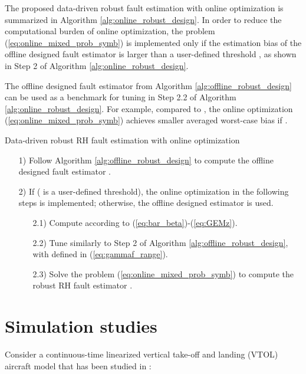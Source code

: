 \documentclass[twocolumn]{autart}
\begin{document}
The proposed data-driven robust fault estimation with online optimization is summarized in Algorithm \ref{alg:online_robust_design}.
In order to reduce the computational burden of online optimization, the problem (\ref{eq:online_mixed_prob_symb}) is implemented only if the estimation bias of the offline designed fault estimator is larger than a user-defined threshold , as shown in Step 2 of Algorithm \ref{alg:online_robust_design}.


The offline designed fault estimator  from Algorithm \ref{alg:offline_robust_design} can be used as a benchmark for tuning  in Step 2.2 of Algorithm \ref{alg:online_robust_design}. For example, compared to , the online optimization (\ref{eq:online_mixed_prob_symb}) achieves smaller averaged worst-case bias if .

\begin{algorithm}
  \caption{Data-driven robust RH fault estimation with online optimization}
  \label{alg:online_robust_design}
  \begin{algorithmic}
    \State
    \begin{enumerate}
      \item[1)] Follow Algorithm \ref{alg:offline_robust_design} to compute the offline designed fault estimator .
      \item[2)] If  ( is a user-defined threshold), the online optimization in the following steps is implemented; otherwise, the offline designed estimator  is used.
          \begin{enumerate}
            \item[2.1)] Compute  according to (\ref{eq:bar_beta})-(\ref{eq:GEMz}).
            \item[2.2)] Tune  similarly to Step 2 of Algorithm \ref{alg:offline_robust_design}, with  defined in (\ref{eq:gammaf_range}).
            \item[2.3)] Solve the problem (\ref{eq:online_mixed_prob_symb}) to compute the robust RH fault estimator .
          \end{enumerate}
    \end{enumerate}
  \end{algorithmic}
\end{algorithm}



\section{Simulation studies}\label{sect:sim}
Consider a continuous-time linearized vertical take-off and landing (VTOL) aircraft model that has been studied in \cite{Dong2012a, Dong2012b, Dong2012c, Gust2001}:
\end{document}
